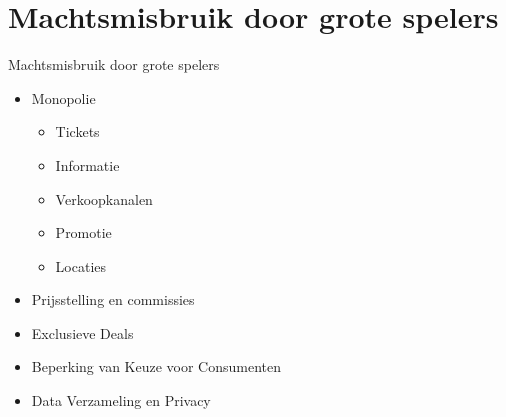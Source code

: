 \documentclass{beamer}
\begin{document}
    
    
    

    
\section[Machtsmisbruik]{Machtsmisbruik door grote spelers}
\begin{frame}{Machtsmisbruik door grote spelers}
    \begin{itemize}
        \item Monopolie
        \begin{itemize}
            \item Tickets
            \item Informatie
            \item Verkoopkanalen
            \item Promotie
            \item Locaties
        \end{itemize}
        \item Prijsstelling en commissies
        \item Exclusieve Deals
        \item Beperking van Keuze voor Consumenten
        \item Data Verzameling en Privacy
  \end{itemize}
\end{frame}
\end{document}
